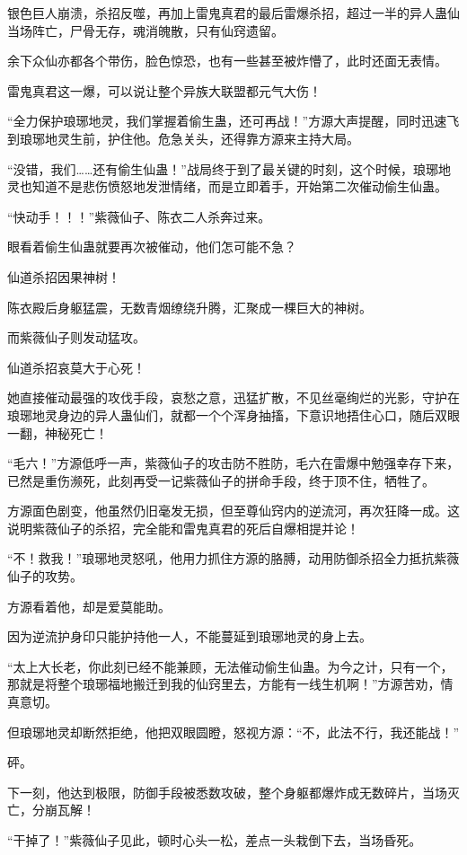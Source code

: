 \begin{this_body}
银色巨人崩溃，杀招反噬，再加上雷鬼真君的最后雷爆杀招，超过一半的异人蛊仙当场阵亡，尸骨无存，魂消魄散，只有仙窍遗留。

余下众仙亦都各个带伤，脸色惊恐，也有一些甚至被炸懵了，此时还面无表情。

雷鬼真君这一爆，可以说让整个异族大联盟都元气大伤！

“全力保护琅琊地灵，我们掌握着偷生蛊，还可再战！”方源大声提醒，同时迅速飞到琅琊地灵生前，护住他。危急关头，还得靠方源来主持大局。

“没错，我们……还有偷生仙蛊！”战局终于到了最关键的时刻，这个时候，琅琊地灵也知道不是悲伤愤怒地发泄情绪，而是立即着手，开始第二次催动偷生仙蛊。

“快动手！！！”紫薇仙子、陈衣二人杀奔过来。

眼看着偷生仙蛊就要再次被催动，他们怎可能不急？

仙道杀招因果神树！

陈衣殿后身躯猛震，无数青烟缭绕升腾，汇聚成一棵巨大的神树。

而紫薇仙子则发动猛攻。

仙道杀招哀莫大于心死！

她直接催动最强的攻伐手段，哀愁之意，迅猛扩散，不见丝毫绚烂的光影，守护在琅琊地灵身边的异人蛊仙们，就都一个个浑身抽搐，下意识地捂住心口，随后双眼一翻，神秘死亡！

“毛六！”方源低呼一声，紫薇仙子的攻击防不胜防，毛六在雷爆中勉强幸存下来，已然是重伤濒死，此刻再受一记紫薇仙子的拼命手段，终于顶不住，牺牲了。

方源面色剧变，他虽然仍旧毫发无损，但至尊仙窍内的逆流河，再次狂降一成。这说明紫薇仙子的杀招，完全能和雷鬼真君的死后自爆相提并论！

“不！救我！”琅琊地灵怒吼，他用力抓住方源的胳膊，动用防御杀招全力抵抗紫薇仙子的攻势。

方源看着他，却是爱莫能助。

因为逆流护身印只能护持他一人，不能蔓延到琅琊地灵的身上去。

“太上大长老，你此刻已经不能兼顾，无法催动偷生仙蛊。为今之计，只有一个，那就是将整个琅琊福地搬迁到我的仙窍里去，方能有一线生机啊！”方源苦劝，情真意切。

但琅琊地灵却断然拒绝，他把双眼圆瞪，怒视方源：“不，此法不行，我还能战！”

砰。

下一刻，他达到极限，防御手段被悉数攻破，整个身躯都爆炸成无数碎片，当场灭亡，分崩瓦解！

“干掉了！”紫薇仙子见此，顿时心头一松，差点一头栽倒下去，当场昏死。


\end{this_body}
